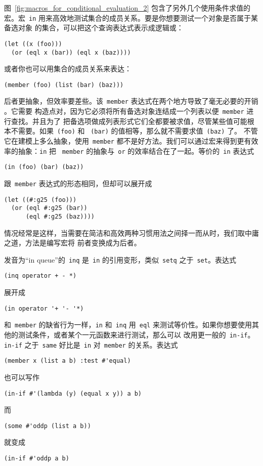 图~\ref{fig:macros_for_conditional_evaluation_2} 包含了另外几个使用条件求值的
宏。宏~\texttt{in} 用来高效地测试集合的成员关系。要是你想要测试一个对象是否属于某备选对象
的集合，可以把这个查询表达式表示成逻辑或：
\begin{lstlisting}
(let ((x (foo)))
  (or (eql x (bar)) (eql x (baz))))
\end{lstlisting}
或者你也可以用集合的成员关系来表达：
\begin{lstlisting}
(member (foo) (list (bar) (baz)))
\end{lstlisting}
后者更抽象，但效率要差些。该~\texttt{member} 表达式在两个地方导致了毫无必要的开销
。它需要
构造点对，因为它必须将所有备选对象连结成一个列表以便~\texttt{member} 进行查找。并且为了
把备选项做成列表形式它们全都要被求值，尽管某些值可能根本不需要。如果~\verb|(foo)| 和
~\verb|(bar)| 的值相等，那么就不需要求值~\texttt{(baz)} 了。
不管它在建模上多么抽象，使用~\texttt{member} 都不是好方法。我们可以通过宏来得到更有效率的抽象：\texttt{in} 把
~\texttt{member} 的抽象与~\texttt{or} 的效率结合在了一起。等价的~\texttt{in} 表达式
\begin{lstlisting}
(in (foo) (bar) (baz))
\end{lstlisting}
跟~\texttt{member} 表达式的形态相同，但却可以展开成
\begin{lstlisting}
(let ((#:g25 (foo)))
  (or (eql #:g25 (bar))
      (eql #:g25 (baz))))
\end{lstlisting}
情况经常是这样，当需要在简洁和高效两种习惯用法之间择一而从时，我们取中庸之道，方法是编写宏将
前者变换成为后者。

发音为``in queue''的~\texttt{inq} 是~\texttt{in} 的引用变形，类似~\texttt{setq}
之于~\texttt{set}。表达式
\begin{lstlisting}
(inq operator + - *)
\end{lstlisting}
展开成
\begin{lstlisting}
(in operator '+ '- '*)
\end{lstlisting}

和~\texttt{member} 的缺省行为一样，\texttt{in} 和~\texttt{inq} 用~\texttt{eql}
来测试等价性。如果你想要使用其他的测试条件，或者某个一元函数来进行测试，那么可以
改用更一般的~\texttt{in-if}。\texttt{in-if} 之于~\texttt{same} 好比是~\texttt{in}
对~\texttt{member} 的关系。表达式
\begin{lstlisting}
(member x (list a b) :test #'equal)
\end{lstlisting}
也可以写作
\begin{lstlisting}
(in-if #'(lambda (y) (equal x y)) a b)
\end{lstlisting}
而
\begin{lstlisting}
(some #'oddp (list a b))
\end{lstlisting}
就变成
\begin{lstlisting}
(in-if #'oddp a b)
\end{lstlisting}

